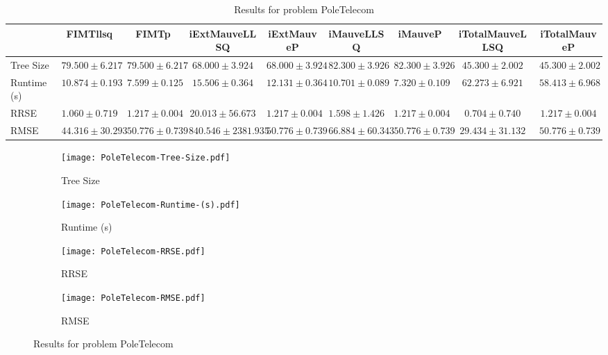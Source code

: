 \documentclass{article}
\begin{document}
\begin{table}[h]
\tiny
\begin{tabular}{|l|c|c|c|c|c|c|c|c|}
\hline
 & FIMTllsq & FIMTp & iExtMauveLLSQ & iExtMauveP & iMauveLLSQ & iMauveP & iTotalMauveLLSQ & iTotalMauveP\\
\hline
Tree Size & $79.500 \pm 6.217$ & $79.500 \pm 6.217$ & $68.000 \pm 3.924$ & $68.000 \pm 3.924$ & $82.300 \pm 3.926$ & $82.300 \pm 3.926$ & \cellcolor{blue!25} $45.300 \pm 2.002$ & \cellcolor{blue!25} $45.300 \pm 2.002$ \\
\hline
Runtime (s) & $10.874 \pm 0.193$ & $7.599 \pm 0.125$ & $15.506 \pm 0.364$ & $12.131 \pm 0.364$ & $10.701 \pm 0.089$ & \cellcolor{blue!25} $7.320 \pm 0.109$ & $62.273 \pm 6.921$ & $58.413 \pm 6.968$ \\
\hline
RRSE & $1.060 \pm 0.719$ & $1.217 \pm 0.004$ & $20.013 \pm 56.673$ & $1.217 \pm 0.004$ & $1.598 \pm 1.426$ & $1.217 \pm 0.004$ & \cellcolor{blue!25} $0.704 \pm 0.740$ & $1.217 \pm 0.004$ \\
\hline
RMSE & $44.316 \pm 30.293$ & $50.776 \pm 0.739$ & $840.546 \pm 2381.935$ & $50.776 \pm 0.739$ & $66.884 \pm 60.343$ & $50.776 \pm 0.739$ & \cellcolor{blue!25} $29.434 \pm 31.132$ & $50.776 \pm 0.739$ \\
\hline
\end{tabular}
\caption{Results for problem PoleTelecom}
\end{table}
\begin{figure}[h]
\centering
\begin{subfigure}{0.45\textwidth}
  \texttt{[image: PoleTelecom-Tree-Size.pdf]}
  \caption{Tree Size}
\end{subfigure}
\begin{subfigure}{0.45\textwidth}
  \texttt{[image: PoleTelecom-Runtime-(s).pdf]}
  \caption{Runtime (s)}
\end{subfigure}
\begin{subfigure}{0.45\textwidth}
  \texttt{[image: PoleTelecom-RRSE.pdf]}
  \caption{RRSE}
\end{subfigure}
\begin{subfigure}{0.45\textwidth}
  \texttt{[image: PoleTelecom-RMSE.pdf]}
  \caption{RMSE}
\end{subfigure}
\caption{Results for problem PoleTelecom}
\end{figure}
\end{document}
